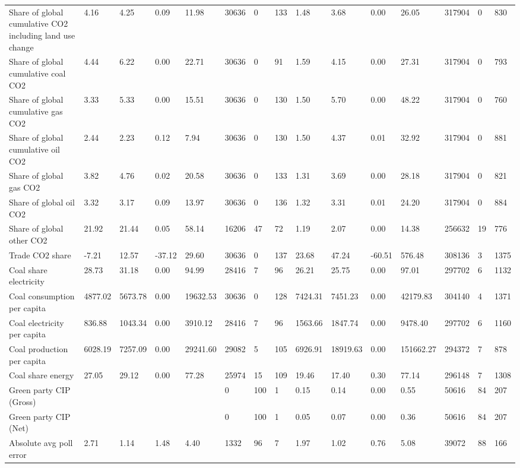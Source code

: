 \begin{longtable}{lllllllllllllll}
Share of global cumulative CO2 including land use change & 4.16 & 4.25 & 0.09 & 11.98 & 30636 & 0 & 133 & 1.48 & 3.68 & 0.00 & 26.05 & 317904 & 0 & 830\\
Share of global cumulative coal CO2 & 4.44 & 6.22 & 0.00 & 22.71 & 30636 & 0 & 91 & 1.59 & 4.15 & 0.00 & 27.31 & 317904 & 0 & 793\\
Share of global cumulative gas CO2 & 3.33 & 5.33 & 0.00 & 15.51 & 30636 & 0 & 130 & 1.50 & 5.70 & 0.00 & 48.22 & 317904 & 0 & 760\\
\addlinespace
Share of global cumulative oil CO2 & 2.44 & 2.23 & 0.12 & 7.94 & 30636 & 0 & 130 & 1.50 & 4.37 & 0.01 & 32.92 & 317904 & 0 & 881\\
Share of global gas CO2 & 3.82 & 4.76 & 0.02 & 20.58 & 30636 & 0 & 133 & 1.31 & 3.69 & 0.00 & 28.18 & 317904 & 0 & 821\\
Share of global oil CO2 & 3.32 & 3.17 & 0.09 & 13.97 & 30636 & 0 & 136 & 1.32 & 3.31 & 0.01 & 24.20 & 317904 & 0 & 884\\
Share of global other CO2 & 21.92 & 21.44 & 0.05 & 58.14 & 16206 & 47 & 72 & 1.19 & 2.07 & 0.00 & 14.38 & 256632 & 19 & 776\\
Trade CO2 share & -7.21 & 12.57 & -37.12 & 29.60 & 30636 & 0 & 137 & 23.68 & 47.24 & -60.51 & 576.48 & 308136 & 3 & 1375\\
\addlinespace
Coal share electricity & 28.73 & 31.18 & 0.00 & 94.99 & 28416 & 7 & 96 & 26.21 & 25.75 & 0.00 & 97.01 & 297702 & 6 & 1132\\
Coal consumption per capita & 4877.02 & 5673.78 & 0.00 & 19632.53 & 30636 & 0 & 128 & 7424.31 & 7451.23 & 0.00 & 42179.83 & 304140 & 4 & 1371\\
Coal electricity per capita & 836.88 & 1043.34 & 0.00 & 3910.12 & 28416 & 7 & 96 & 1563.66 & 1847.74 & 0.00 & 9478.40 & 297702 & 6 & 1160\\
Coal production per capita & 6028.19 & 7257.09 & 0.00 & 29241.60 & 29082 & 5 & 105 & 6926.91 & 18919.63 & 0.00 & 151662.27 & 294372 & 7 & 878\\
Coal share energy & 27.05 & 29.12 & 0.00 & 77.28 & 25974 & 15 & 109 & 19.46 & 17.40 & 0.30 & 77.14 & 296148 & 7 & 1308\\
\addlinespace
Green party CIP (Gross) &  &  &  &  & 0 & 100 & 1 & 0.15 & 0.14 & 0.00 & 0.55 & 50616 & 84 & 207\\
Green party CIP (Net) &  &  &  &  & 0 & 100 & 1 & 0.05 & 0.07 & 0.00 & 0.36 & 50616 & 84 & 207\\
Absolute avg poll error & 2.71 & 1.14 & 1.48 & 4.40 & 1332 & 96 & 7 & 1.97 & 1.02 & 0.76 & 5.08 & 39072 & 88 & 166\\

\end{longtable}

